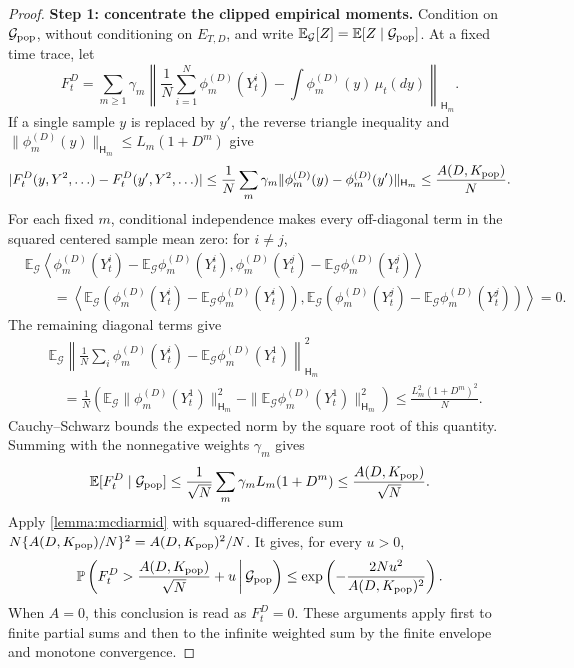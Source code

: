 \begin{proof}
\noindent\textbf{Step 1: concentrate the clipped empirical moments.}
Condition on $\mathcal G_{\rm pop}$, without conditioning on $E_{T,D}$,
and write $\mathbb E_{\mathcal G}[Z]=\mathbb E[Z\mid\mathcal G_{\rm pop}]$.
At a fixed time trace, let
\[
 F_t^D=\sum_{m\ge1}\gamma_m
 \left\|\frac1N\sum_{i=1}^N\phi_m^{(D)}(Y_t^i)
       -\int\phi_m^{(D)}(y)\,\mu_t(dy)\right\|_{\mathsf H_m}.
\]
If a single sample $y$ is replaced by $y'$, the reverse triangle inequality
and $\|\phi_m^{(D)}(y)\|_{\mathsf H_m}\le L_m(1+D^m)$ give
\[
 |F_t^D(y,Y^2,\ldots)-F_t^D(y',Y^2,\ldots)|
 \le\frac1N\sum_m\gamma_m
       \|\phi_m^{(D)}(y)-\phi_m^{(D)}(y')\|_{\mathsf H_m}
 \le\frac{A(D,K_{\rm pop})}{N}.
\]
For each fixed $m$, conditional independence makes every off-diagonal term
in the squared centered sample mean zero: for $i\ne j$,
\[
\begin{aligned}
 &\mathbb E_{\mathcal G}\left\langle
 \phi_m^{(D)}(Y_t^i)-\mathbb E_{\mathcal G}\phi_m^{(D)}(Y_t^i),
 \phi_m^{(D)}(Y_t^j)-\mathbb E_{\mathcal G}\phi_m^{(D)}(Y_t^j)
 \right\rangle\\
 &\qquad=\left\langle
 \mathbb E_{\mathcal G}(\phi_m^{(D)}(Y_t^i)-\mathbb E_{\mathcal G}\phi_m^{(D)}(Y_t^i)),
 \mathbb E_{\mathcal G}(\phi_m^{(D)}(Y_t^j)-\mathbb E_{\mathcal G}\phi_m^{(D)}(Y_t^j))
 \right\rangle=0.
\end{aligned}
\]
The remaining diagonal terms give
\[
\begin{aligned}
 &\mathbb E_{\mathcal G}\left\|
    \frac1N\sum_i\phi_m^{(D)}(Y_t^i)
           -\mathbb E_{\mathcal G}\phi_m^{(D)}(Y_t^1)\right\|_{\mathsf H_m}^2\\
 &\quad=\frac1N\left(
      \mathbb E_{\mathcal G}\|\phi_m^{(D)}(Y_t^1)\|_{\mathsf H_m}^2
      -\|\mathbb E_{\mathcal G}\phi_m^{(D)}(Y_t^1)\|_{\mathsf H_m}^2\right)
 \le\frac{L_m^2(1+D^m)^2}{N}.
\end{aligned}
\]
Cauchy--Schwarz bounds the expected norm by the square root of this
quantity. Summing with the nonnegative weights $\gamma_m$ gives
\[
 \mathbb E[F_t^D\mid\mathcal G_{\rm pop}]
 \le\frac1{\sqrt N}\sum_m\gamma_mL_m(1+D^m)
 \le\frac{A(D,K_{\rm pop})}{\sqrt N}.
\]
Apply \cref{lemma:mcdiarmid} with squared-difference sum
$N\{A(D,K_{\rm pop})/N\}^2=A(D,K_{\rm pop})^2/N$. It gives, for every $u>0$,
\[
 \mathbb P\left(
 F_t^D>\frac{A(D,K_{\rm pop})}{\sqrt N}+u
 \,\middle|\,\mathcal G_{\rm pop}\right)
 \le \exp\left(-\frac{2Nu^2}{A(D,K_{\rm pop})^2}\right).
\]
When $A=0$, this conclusion is read as $F_t^D=0$.
These arguments apply first to finite partial sums and then to the
infinite weighted sum by the finite envelope and monotone convergence.


\end{proof}
